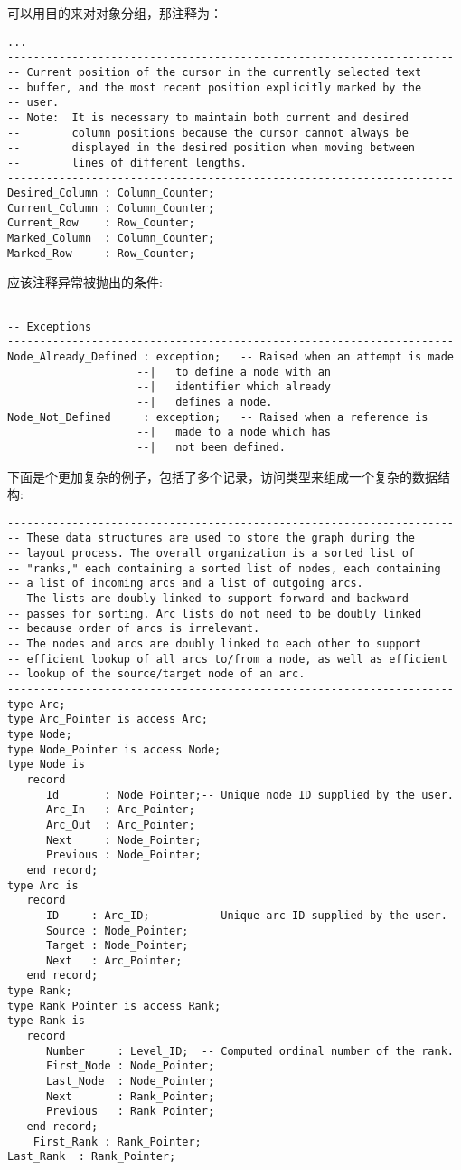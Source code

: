 \begin{blockindent}
可以用目的来对对象分组，那注释为：
\begin{lstlisting}
...
---------------------------------------------------------------------
-- Current position of the cursor in the currently selected text
-- buffer, and the most recent position explicitly marked by the
-- user.
-- Note:  It is necessary to maintain both current and desired
--        column positions because the cursor cannot always be
--        displayed in the desired position when moving between
--        lines of different lengths.
---------------------------------------------------------------------
Desired_Column : Column_Counter;
Current_Column : Column_Counter;
Current_Row    : Row_Counter;
Marked_Column  : Column_Counter;
Marked_Row     : Row_Counter;
\end{lstlisting}
应该注释异常被抛出的条件:
\begin{lstlisting}
---------------------------------------------------------------------
-- Exceptions
---------------------------------------------------------------------
Node_Already_Defined : exception;   -- Raised when an attempt is made
				    --|   to define a node with an
				    --|   identifier which already
				    --|   defines a node.
Node_Not_Defined     : exception;   -- Raised when a reference is
				    --|   made to a node which has
				    --|   not been defined.
\end{lstlisting}
下面是个更加复杂的例子，包括了多个记录，访问类型来组成一个复杂的数据结构:
\begin{lstlisting}
---------------------------------------------------------------------
-- These data structures are used to store the graph during the
-- layout process. The overall organization is a sorted list of
-- "ranks," each containing a sorted list of nodes, each containing
-- a list of incoming arcs and a list of outgoing arcs.
-- The lists are doubly linked to support forward and backward
-- passes for sorting. Arc lists do not need to be doubly linked
-- because order of arcs is irrelevant.
-- The nodes and arcs are doubly linked to each other to support
-- efficient lookup of all arcs to/from a node, as well as efficient
-- lookup of the source/target node of an arc.
---------------------------------------------------------------------
type Arc;
type Arc_Pointer is access Arc;
type Node;
type Node_Pointer is access Node;
type Node is
   record
      Id       : Node_Pointer;-- Unique node ID supplied by the user.
      Arc_In   : Arc_Pointer;
      Arc_Out  : Arc_Pointer;
      Next     : Node_Pointer;
      Previous : Node_Pointer;
   end record;
type Arc is
   record
      ID     : Arc_ID;        -- Unique arc ID supplied by the user.
      Source : Node_Pointer;
      Target : Node_Pointer;
      Next   : Arc_Pointer;
   end record;
type Rank;
type Rank_Pointer is access Rank;
type Rank is
   record
      Number     : Level_ID;  -- Computed ordinal number of the rank.
      First_Node : Node_Pointer;
      Last_Node  : Node_Pointer;
      Next       : Rank_Pointer;
      Previous   : Rank_Pointer;
   end record;
    First_Rank : Rank_Pointer;
Last_Rank  : Rank_Pointer;
\end{lstlisting}
\end{blockindent}


